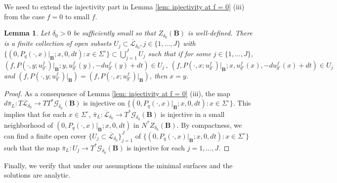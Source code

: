 \documentclass[11pt]{amsart}
\newtheorem{Lemma}[Theorem]{Lemma}
\theoremstyle{definition}
\numberwithin{equation}{section}
\newcommand{\BB}{\mathbf B}
\begin{document}
We need to extend the injectivity part in Lemma \ref{lem: injectivity at f = 0} (iii) from the case $f=0$ to small $f$.
\begin{Lemma}
\label{lem: nbhds of injectivity}
Let $\delta_0>0$ be sufficiently small so that $Z_{\delta_0}(\BB)$ is well-defined. There is a finite collection of open subsets $U_j\subset \overline{\mathcal L}_{\delta_0}, j\in\{1,\dots,J\}$ with $\{(0, P_q(\cdot, x)\vert_\BB; x, 0, dt)\colon x\in \Sigma^\circ\}\subset \bigcup_{j=1}^J U_j$ such that if for some $j\in \{1,\dots,J\}$, 
\[
	(f, P(\cdot, y; u_{g^\circ}^{f})\vert_{\BB} ;y, u_{g^\circ}^{f} (y),  -du_{g^\circ}^{f}(y) + dt )\in U_j\,,\  (f, P(\cdot, x; u_{g^\circ}^{f})\vert_{\BB} ;x, u_{g^\circ}^{f} (x),  -du_{g^\circ}^{f}(x) + dt )\in U_j
\]
and $ (f, P(\cdot, y; u_{g^\circ}^{f})\vert_{\BB}) = (f, P(\cdot, x; u_{g^\circ}^{f})\vert_{\BB})$, then $x=y$.
\end{Lemma}
\begin{proof}
As a consequence of Lemma \ref{lem: injectivity at f = 0} (iii), the map $d\bar \pi_L: T\overline{\mathcal L}_{\delta_0} \to TT^*\mathcal G_{\delta_0}(\BB)$ is injective on $\{(0, P_q(\cdot, x)\vert_\BB; x, 0, dt)\colon x\in \Sigma^\circ\}$. This implies that for each $x\in \Sigma^\circ$, $\bar\pi_L : \overline{\mathcal L}_{\delta_0} \to T^*\mathcal G_{\delta_0}(\BB)$ is injective in a small neighborhood of $(0, P_q(\cdot, x)\vert_\BB; x, 0, dt)$ in $ N^*Z_{\delta_0}(\BB)$. By compactness, we can find a finite open cover $\{U_j \subset \overline{\mathcal L}_{\delta_0}\}_{j=1}^J$ of 
$\{(0, P_q(\cdot, x)\vert_\BB; x, 0, dt)\colon x\in \Sigma^\circ\}$
such that the map $\bar\pi_L: U_j \to T^*\mathcal G_{\delta_0}(\BB)$ is injective for each $j= 1,\dots,J$. 
\end{proof}

Finally, we verify that under our assumptions the minimal surfaces and the solutions are analytic.
\end{document}
